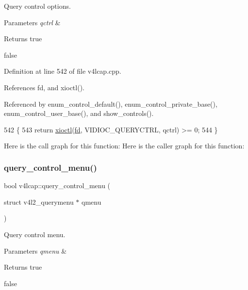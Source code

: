 Query control options. 


\begin{DoxyParams}{Parameters}
{\em qctrl} & \\
\hline
\end{DoxyParams}
\begin{DoxyReturn}{Returns}
true 

false 
\end{DoxyReturn}


Definition at line 542 of file v4lcap.\+cpp.



References fd, and xioctl().



Referenced by enum\+\_\+control\+\_\+default(), enum\+\_\+control\+\_\+private\+\_\+base(), enum\+\_\+control\+\_\+user\+\_\+base(), and show\+\_\+controls().


\begin{DoxyCode}
542                                                         \{
543     \textcolor{keywordflow}{return} \hyperlink{classv4lcap_ab5aaa5a8c0df17f5ca57e0b5170232cb}{xioctl}(\hyperlink{classv4lcap_a38109593bde997dad13b3a461569573d}{fd}, VIDIOC\_QUERYCTRL, qctrl) >= 0;
544 \}
\end{DoxyCode}
Here is the call graph for this function\+:
Here is the caller graph for this function\+:
\mbox{\label{classv4lcap_aa23f5ba6c1828dc3af8258d8a33b95e4}} 
\subsubsection{\texorpdfstring{query\+\_\+control\+\_\+menu()}{query\_control\_menu()}}
{\footnotesize\ttfamily bool v4lcap\+::query\+\_\+control\+\_\+menu (\begin{DoxyParamCaption}\item[{struct v4l2\+\_\+querymenu $\ast$}]{qmenu }\end{DoxyParamCaption})}



Query control menu. 


\begin{DoxyParams}{Parameters}
{\em qmenu} & \\
\hline
\end{DoxyParams}
\begin{DoxyReturn}{Returns}
true 

false 
\end{DoxyReturn}


